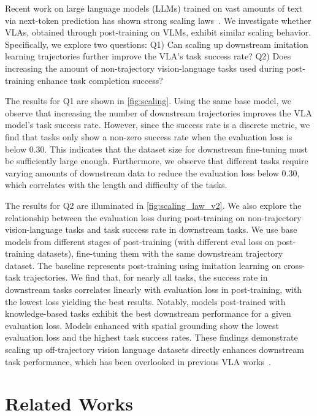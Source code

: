 Recent work on large language models (LLMs) trained on vast amounts of text via next-token prediction has shown strong scaling laws~\citep{Emergent_abilities_openai,Emergent_abilities_zhipu,lin2024selecting,wangoptimizing}. We investigate whether VLAs, obtained through post-training on VLMs, exhibit similar scaling behavior. Specifically, we explore two questions: Q1) Can scaling up downstream imitation learning trajectories further improve the VLA’s task success rate? Q2) Does increasing the amount of non-trajectory vision-language tasks used during post-training enhance task completion success?

The results for Q1 are shown in \autoref{fig:scaling}. Using the same base model, we observe that increasing the number of downstream trajectories improves the VLA model’s task success rate. However, since the success rate is a discrete metric, we find that tasks only show a non-zero success rate when the evaluation loss is below 0.30. This indicates that the dataset size for downstream fine-tuning must be sufficiently large enough. Furthermore, we observe that different tasks require varying amounts of downstream data to reduce the evaluation loss below 0.30, which correlates with the length and difficulty of the tasks.



The results for Q2 are illuminated in \autoref{fig:scaling_law_v2}. We also explore the relationship between the evaluation loss during post-training on non-trajectory vision-language tasks and task success rate in downstream tasks. We use base models from different stages of post-training (with different eval loss on post-training datasets), fine-tuning them with the same downstream trajectory dataset. The baseline represents post-training using imitation learning on cross-task trajectories. We find that, for nearly all tasks, the success rate in downstream tasks correlates linearly with evaluation loss in post-training, with the lowest loss yielding the best results. Notably, models post-trained with knowledge-based tasks exhibit the best downstream performance for a given evaluation loss. Models enhanced with spatial grounding show the lowest evaluation loss and the highest task success rates.
These findings demonstrate scaling up off-trajectory vision language datasets directly enhances downstream task performance, which has been overlooked in previous VLA works~\citep{openVLA,rt-2}. 

\section{Related Works}
\label{Preliminary}

